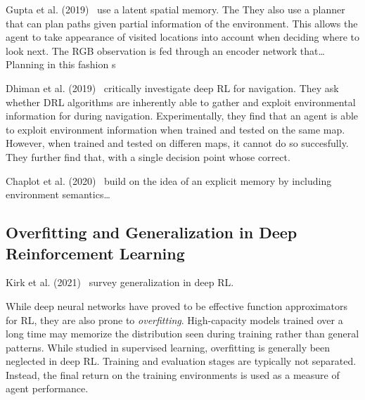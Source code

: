 Gupta et al. (2019)~\cite{gupta_cognitive_2019} use a latent spatial memory.
The 
They also use a planner that can plan paths given partial information of the environment.
This allows the agent to take appearance of visited locations into account when deciding where to look next.
The RGB observation is fed through an encoder network that\dots
Planning in this fashion s

Dhiman et al. (2019)~\cite{dhiman_critical_2019} critically investigate deep RL for navigation.
They ask whether DRL algorithms are inherently able to gather and exploit environmental information for during navigation.
Experimentally, they find that an agent is able to exploit environment information when trained and tested on the same map.
However, when trained and tested on differen maps, it cannot do so succesfully.
They further find that, with a single decision point whose correct.

Chaplot et al. (2020)~\cite{chaplot_semantic_2020} build on the idea of an explicit memory by including environment semantics\dots

\subsection{Overfitting and Generalization in Deep Reinforcement Learning}


Kirk et al. (2021)~\cite{kirk_survey_2022} survey generalization in deep RL.


While deep neural networks have proved to be effective function approximators for RL, they are also prone to \textit{overfitting}.
High-capacity models trained over a long time may memorize the distribution seen during training rather than general patterns.
While studied in supervised learning, overfitting is generally been neglected in deep RL.
Training and evaluation stages are typically not separated.
Instead, the final return on the training environments is used as a measure of agent performance.

